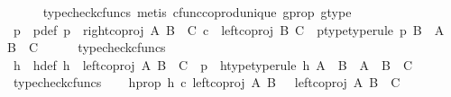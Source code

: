 \begin{isabellebody}
\ \ \ \ \isamarkupfalse%
\ {\isacharparenleft}{\kern0pt}typecheck{\isacharunderscore}{\kern0pt}cfuncs{\isacharcomma}{\kern0pt}\ metis\ cfunc{\isacharunderscore}{\kern0pt}coprod{\isacharunderscore}{\kern0pt}unique\ g{\isacharunderscore}{\kern0pt}prop\ g{\isacharunderscore}{\kern0pt}type{\isacharparenright}{\kern0pt}\isanewline
\isanewline
\ \ \isamarkupfalse%
\ p\ \ p{\isacharunderscore}{\kern0pt}def{\isacharcolon}{\kern0pt}\ {\isachardoublequoteopen}p\ {\isacharequal}{\kern0pt}\ {\isacharparenleft}{\kern0pt}right{\isacharunderscore}{\kern0pt}coproj\ A\ {\isacharparenleft}{\kern0pt}B\ {\isasymCoprod}\ C{\isacharparenright}{\kern0pt}{\isacharparenright}{\kern0pt}\ {\isasymcirc}\isactrlsub c\ \ {\isacharparenleft}{\kern0pt}left{\isacharunderscore}{\kern0pt}coproj\ B\ C{\isacharparenright}{\kern0pt}{\isachardoublequoteclose}\ \ p{\isacharunderscore}{\kern0pt}type{\isacharbrackleft}{\kern0pt}type{\isacharunderscore}{\kern0pt}rule{\isacharbrackright}{\kern0pt}{\isacharcolon}{\kern0pt}\ {\isachardoublequoteopen}p{\isacharcolon}{\kern0pt}\ B\ {\isasymrightarrow}\ A\ {\isasymCoprod}\ {\isacharparenleft}{\kern0pt}B\ {\isasymCoprod}\ C{\isacharparenright}{\kern0pt}{\isachardoublequoteclose}\isanewline
\ \ \ \ \isamarkupfalse%
\ typecheck{\isacharunderscore}{\kern0pt}cfuncs\isanewline
\ \ \isamarkupfalse%
\ h\ \ h{\isacharunderscore}{\kern0pt}def{\isacharcolon}{\kern0pt}\ {\isachardoublequoteopen}h\ {\isacharequal}{\kern0pt}\ {\isacharparenleft}{\kern0pt}left{\isacharunderscore}{\kern0pt}coproj\ A\ {\isacharparenleft}{\kern0pt}B\ {\isasymCoprod}\ C{\isacharparenright}{\kern0pt}{\isacharparenright}{\kern0pt}\ {\isasymamalg}\ p{\isachardoublequoteclose}\ \ h{\isacharunderscore}{\kern0pt}type{\isacharbrackleft}{\kern0pt}type{\isacharunderscore}{\kern0pt}rule{\isacharbrackright}{\kern0pt}{\isacharcolon}{\kern0pt}\ {\isachardoublequoteopen}h{\isacharcolon}{\kern0pt}\ {\isacharparenleft}{\kern0pt}A\ {\isasymCoprod}\ B{\isacharparenright}{\kern0pt}\ {\isasymrightarrow}\ A\ {\isasymCoprod}\ {\isacharparenleft}{\kern0pt}B\ {\isasymCoprod}\ C{\isacharparenright}{\kern0pt}{\isachardoublequoteclose}\isanewline
\ \ \ \ \isamarkupfalse%
\ typecheck{\isacharunderscore}{\kern0pt}cfuncs\isanewline
\ \ \isamarkupfalse%
\ h{\isacharunderscore}{\kern0pt}prop{}{\isacharcolon}{\kern0pt}\ {\isachardoublequoteopen}h\ {\isasymcirc}\isactrlsub c\ {\isacharparenleft}{\kern0pt}left{\isacharunderscore}{\kern0pt}coproj\ A\ B{\isacharparenright}{\kern0pt}\ \ {\isacharequal}{\kern0pt}\ {\isacharparenleft}{\kern0pt}left{\isacharunderscore}{\kern0pt}coproj\ A\ {\isacharparenleft}{\kern0pt}B\ {\isasymCoprod}\ C{\isacharparenright}{\kern0pt}{\isacharparenright}{\kern0pt}{\isachardoublequoteclose}\isanewline

\end{isabellebody}
